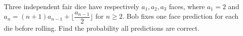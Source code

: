Three independent fair dice have respectively $a_1,a_2,a_3$ faces, where $a_1=2$ and $a_n=(n+1)a_{n-1}+\lfloor\dfrac{a_{n-1}}{2}\rfloor$ for $n\ge2$. Bob fixes one face prediction for each die before rolling. Find the probability all predictions are correct.
